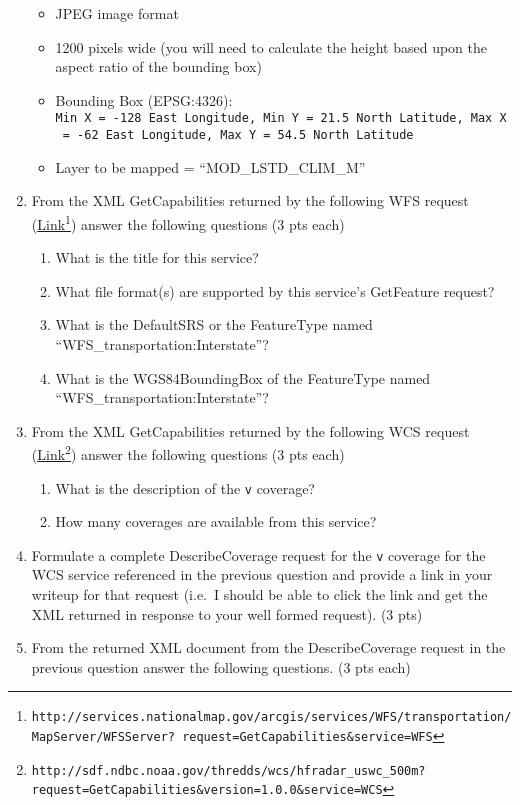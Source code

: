 \documentclass[]{article}
\providecommand{\tightlist}{%
  \setlength{\itemsep}{0pt}\setlength{\parskip}{0pt}}
\begin{document}
\begin{enumerate}
  \begin{itemize}
  \tightlist
  \item
    JPEG image format
  \item
    1200 pixels wide (you will need to calculate the height based upon
    the aspect ratio of the bounding box)
  \item
    Bounding Box (EPSG:4326):
    \texttt{Min\ X\ =\ -128\ East\ Longitude,\ Min\ Y\ =\ 21.5\ North\ Latitude,\ Max\ X\ =\ -62\ East\ Longitude,\ Max\ Y\ =\ 54.5\ North\ Latitude}
  \item
    Layer to be mapped = ``MOD\_LSTD\_CLIM\_M''
  \end{itemize}
\item
  From the XML GetCapabilities returned by the following WFS request
  (\href{http://services.nationalmap.gov/arcgis/services/WFS/transportation/MapServer/WFSServer?request=GetCapabilities\&service=WFS}{Link\footnote{\texttt{http://services.nationalmap.gov/arcgis/services/WFS/transportation/MapServer/WFSServer?\ request=GetCapabilities\&service=WFS}}})
  answer the following questions (3 pts each) 

  \begin{enumerate}
  \def\labelenumii{\alph{enumii}.}
  \tightlist
  \item
    What is the title for this service?
  \item
    What file format(s) are supported by this service's GetFeature
    request?
  \item
    What is the DefaultSRS or the FeatureType named
    ``WFS\_transportation:Interstate''?
  \item
    What is the WGS84BoundingBox of the FeatureType named
    ``WFS\_transportation:Interstate''?
  \end{enumerate}
\item
  From the XML GetCapabilities returned by the following WCS request
  (\href{http://sdf.ndbc.noaa.gov/thredds/wcs/hfradar_uswc_500m?request=GetCapabilities\&version=1.0.0\&service=WCS}{Link\footnote{\texttt{http://sdf.ndbc.noaa.gov/thredds/wcs/hfradar\_uswc\_500m?request=GetCapabilities\&version=1.0.0\&service=WCS}}})
  answer the following questions (3 pts each)

  \begin{enumerate}
  \def\labelenumii{\alph{enumii}.}
  \tightlist
  \item
    What is the description of the \texttt{v} coverage?
  \item
    How many coverages are available from this service?
  \end{enumerate}
\item
  Formulate a complete DescribeCoverage request for the \texttt{v}
  coverage for the WCS service referenced in the previous question and
  provide a link in your writeup for that request (i.e.~I should be able
  to click the link and get the XML returned in response to your well
  formed request). (3 pts)
\item
  From the returned XML document from the DescribeCoverage request in
  the previous question answer the following questions. (3 pts each)


\end{enumerate}
\end{document}

